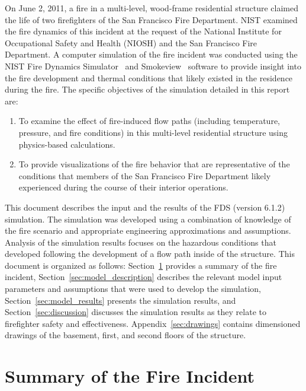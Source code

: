 \documentclass[12pt,oneside]{book}
\begin{document}
On June 2, 2011, a fire in a multi-level, wood-frame residential structure claimed the life of two firefighters of the San Francisco Fire Department. NIST examined the fire dynamics of this incident at the request of the National Institute for Occupational Safety and Health (NIOSH) and the San Francisco Fire Department. A computer simulation of the fire incident was conducted using the NIST Fire Dynamics Simulator~\cite{FDS_Users_Guide} and Smokeview~\cite{Smokeview_Users_Guide} software to provide insight into the fire development and thermal conditions that likely existed in the residence during the fire. The specific objectives of the simulation detailed in this report are:
\begin{enumerate}
\item To examine the effect of fire-induced flow paths (including temperature, pressure, and fire conditions) in this multi-level residential structure using physics-based calculations.
\item To provide visualizations of the fire behavior that are representative of the conditions that members of the San Francisco Fire Department likely experienced during the course of their interior operations.
\end{enumerate}
This document describes the input and the results of the FDS (version 6.1.2) simulation. The simulation was developed using a combination of knowledge of the fire scenario and appropriate engineering approximations and assumptions. Analysis of the simulation results focuses on the hazardous conditions that developed following the development of a flow path inside of the structure. This document is organized as follows: Section~\ref{sec:incident_summary} provides a summary of the fire incident, Section~\ref{sec:model_description} describes the relevant model input parameters and assumptions that were used to develop the simulation, Section~\ref{sec:model_results} presents the simulation results, and Section~\ref{sec:discussion} discusses the simulation results as they relate to firefighter safety and effectiveness. Appendix~\ref{sec:drawings} contains dimensioned drawings of the basement, first, and second floors of the structure.


\chapter{Summary of the Fire Incident}
\label{sec:incident_summary}
\end{document}
